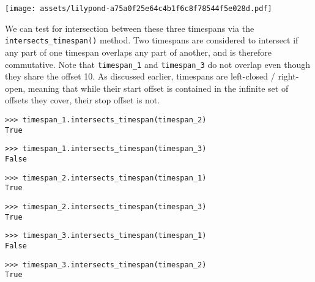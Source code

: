 \begin{comment}
<abjad>[hide=true]
timespan_inventory = timespantools.TimespanInventory([
    timespan_1,
    timespan_2,
    timespan_3,
    ])
show(timespan_inventory)
</abjad>
\end{comment}

\begin{singlespacing}
\vspace{-0.5\baselineskip}
\noindent\texttt{[image: assets/lilypond-a75a0f25e64c4b1f6c8f78544f5e028d.pdf]}
\end{singlespacing}

\noindent We can test for intersection between these three timespans via the
\texttt{intersects\_timespan()} method. Two timespans are considered to
intersect if any part of one timespan overlaps any part of another, and is
therefore commutative. Note that \texttt{timespan\_1} and \texttt{timespan\_3}
do not overlap even though they share the offset 10. As discussed earlier,
timespans are left-closed / right-open, meaning that while their start offset is
contained in the infinite set of offsets they cover, their stop offset is not.

\begin{comment}
<abjad>
timespan_1.intersects_timespan(timespan_2)
timespan_1.intersects_timespan(timespan_3)
timespan_2.intersects_timespan(timespan_1)
timespan_2.intersects_timespan(timespan_3)
timespan_3.intersects_timespan(timespan_1)
timespan_3.intersects_timespan(timespan_2)
</abjad>
\end{comment}

\begin{singlespacing}
\vspace{-0.5\baselineskip}
\begin{lstlisting}
>>> timespan_1.intersects_timespan(timespan_2)
True
\end{lstlisting}
\begin{lstlisting}
>>> timespan_1.intersects_timespan(timespan_3)
False
\end{lstlisting}
\begin{lstlisting}
>>> timespan_2.intersects_timespan(timespan_1)
True
\end{lstlisting}
\begin{lstlisting}
>>> timespan_2.intersects_timespan(timespan_3)
True
\end{lstlisting}
\begin{lstlisting}
>>> timespan_3.intersects_timespan(timespan_1)
False
\end{lstlisting}
\begin{lstlisting}
>>> timespan_3.intersects_timespan(timespan_2)
True
\end{lstlisting}
\end{singlespacing}

